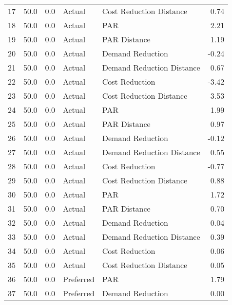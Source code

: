 \begin{longtable}{lrrllr}
17   &         50.0 &     0.0 &         Actual &    Cost Reduction Distance &   0.74 \\
18   &         50.0 &     0.0 &         Actual &                        PAR &   2.21 \\
19   &         50.0 &     0.0 &         Actual &               PAR Distance &   1.19 \\
20   &         50.0 &     0.0 &         Actual &           Demand Reduction &  -0.24 \\
21   &         50.0 &     0.0 &         Actual &  Demand Reduction Distance &   0.67 \\
22   &         50.0 &     0.0 &         Actual &             Cost Reduction &  -3.42 \\
23   &         50.0 &     0.0 &         Actual &    Cost Reduction Distance &   3.53 \\
24   &         50.0 &     0.0 &         Actual &                        PAR &   1.99 \\
25   &         50.0 &     0.0 &         Actual &               PAR Distance &   0.97 \\
26   &         50.0 &     0.0 &         Actual &           Demand Reduction &  -0.12 \\
27   &         50.0 &     0.0 &         Actual &  Demand Reduction Distance &   0.55 \\
28   &         50.0 &     0.0 &         Actual &             Cost Reduction &  -0.77 \\
29   &         50.0 &     0.0 &         Actual &    Cost Reduction Distance &   0.88 \\
30   &         50.0 &     0.0 &         Actual &                        PAR &   1.72 \\
31   &         50.0 &     0.0 &         Actual &               PAR Distance &   0.70 \\
32   &         50.0 &     0.0 &         Actual &           Demand Reduction &   0.04 \\
33   &         50.0 &     0.0 &         Actual &  Demand Reduction Distance &   0.39 \\
34   &         50.0 &     0.0 &         Actual &             Cost Reduction &   0.06 \\
35   &         50.0 &     0.0 &         Actual &    Cost Reduction Distance &   0.05 \\
36   &         50.0 &     0.0 &      Preferred &                        PAR &   1.79 \\
37   &         50.0 &     0.0 &      Preferred &           Demand Reduction &   0.00 \\

\end{longtable}
